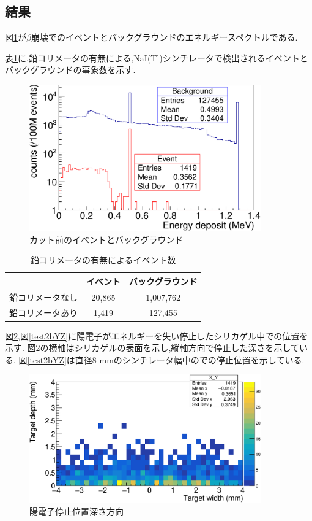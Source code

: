 \subsection{結果}

図\ref{test2}が$\beta$崩壊でのイベントとバックグラウンドのエネルギースペクトルである.

表\ref{table_test2}に,鉛コリメータの有無による,NaI(Tl)シンチレータで検出されるイベントとバックグラウンドの事象数を示す.


\begin{figure}[htbp]
	\centering
		\includegraphics[width=10cm]{fig/test2.pdf}
	\caption{カット前のイベントとバックグラウンド}
	\label{test2}
\end{figure}

\begin{table}[htbp]
	\centering
	\caption{鉛コリメータの有無によるイベント数}
		\label{table_test2}	
	  \begin{tabular}{ccc} 
		\hline
		   				&イベント& バックグラウンド \\ 
		\hline \hline
		鉛コリメータなし & 20,865 & 1,007,762 \\
		鉛コリメータあり & 1,419  & 127,455   \\
		\hline
	  \end{tabular}
\end{table}

図\ref{test2bXY},図\ref{test2bYZ}に陽電子がエネルギーを失い停止したシリカゲル中での位置を示す.
図\ref{test2bXY}の横軸はシリカゲルの表面を示し,縦軸方向で停止した深さを示している.
図\ref{test2bYZ}は直径8 mmのシンチレータ幅中のでの停止位置を示している.

\begin{figure}[htbp]
	\centering
		\includegraphics[width=10cm]{fig/test2bXY.pdf}
	\caption{陽電子停止位置深さ方向}
	\label{test2bXY}
\end{figure}

